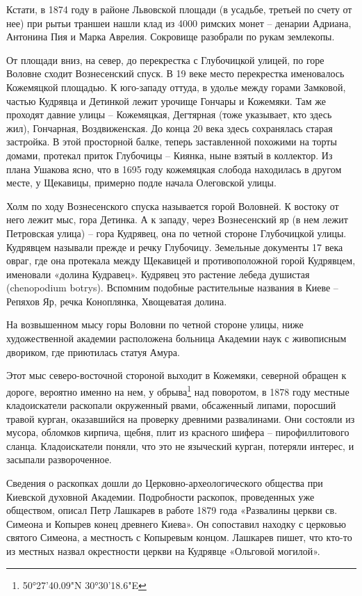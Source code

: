 Кстати, в 1874 году в районе Львовской площади (в усадьбе, третьей по счету от нее) при рытьи траншеи нашли клад из 4000 римских монет – денарии Адриана, Антонина Пия и Марка Аврелия. Сокровище разобрали по рукам землекопы.

От площади вниз, на север, до перекрестка с Глубочицкой улицей, по горе Воловне сходит Вознесенский спуск. В 19 веке место перекрестка именовалось Кожемяцкой площадью. К юго-западу оттуда, в удолье между горами Замковой, частью Кудрявца и Детинкой лежит урочище Гончары и Кожемяки. Там же проходят давние улицы – Кожемяцкая, Дегтярная (тоже указывает, кто здесь жил), Гончарная, Воздвиженская. До конца 20 века здесь сохранялась старая застройка. В этой просторной балке, теперь заставленной похожими на торты домами, протекал приток Глубочицы – Киянка, ныне взятый в коллектор. Из плана Ушакова ясно, что в 1695 году кожемяцкая слобода находилась в другом месте, у Щекавицы, примерно подле начала Олеговской улицы.

Холм по ходу Вознесенского спуска называется горой Воловней. К востоку от него лежит мыс, гора Детинка. А к западу, через Вознесенский яр (в нем лежит Петровская улица) – гора Кудрявец, она по четной стороне Глубочицкой улицы. Кудрявцем называли прежде и речку Глубочицу. Земельные документы 17 века овраг, где она протекала между Щекавицей и противоположной горой Кудрявцем, именовали «долина Кудравец». Кудрявец это растение лебеда душистая (chenopodium botrys). Вспомним подобные растительные названия в Киеве – Репяхов Яр, речка Коноплянка, Хвощеватая долина.

На возвышенном мысу горы Воловни по четной стороне улицы, ниже художественной академии расположена больница Академии наук с живописным двориком, где приютилась статуя Амура. 

Этот мыс северо-восточной стороной выходит в Кожемяки, северной обращен к дороге, вероятно именно на нем, у обрыва\footnote{50°27'40.09"N 30°30'18.6"E} над поворотом, в 1878 году местные кладоискатели раскопали окруженный рвами, обсаженный липами, поросший травой курган, оказавшийся на проверку древними развалинами. Они состояли из мусора, обломков кирпича, щебня, плит из красного шифера – пирофиллитового сланца. Кладоискатели поняли, что это не языческий курган, потеряли интерес, и засыпали развороченное.

Сведения о раскопках дошли до Церковно-археологи\-ческого общества при Киевской духовной Академии. Подробности раскопок, проведенных уже обществом, описал Петр Лашкарев в работе 1879 года «Развалины церкви св. Симеона и Копырев конец древнего Киева». Он сопоставил находку с церковью святого Симеона, а местность с Копыревым концом. Лашкарев пишет, что кто-то из местных назвал окрестности церкви на Кудрявце «Ольговой могилой».

